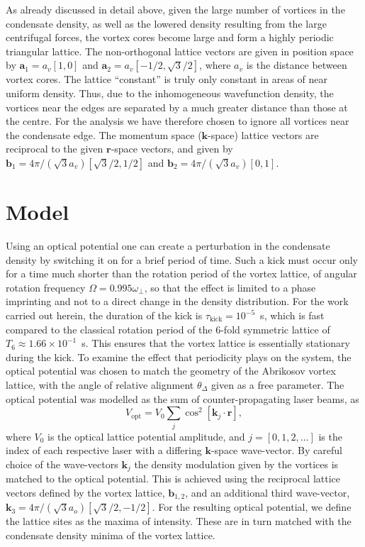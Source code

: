 As already discussed in detail above, given the large number of vortices in the condensate density, as well as the lowered density resulting from the large centrifugal forces, the vortex cores become large and form a highly periodic triangular lattice. The non-orthogonal lattice vectors are given in position space by $\mathbf{a}_1 = a_v[1,0]$ and $\mathbf{a}_2 = a_v[-1/2, \sqrt{3}/2]$, where $a_v$ is the distance between vortex cores. The lattice ``constant'' is truly only constant in areas of near uniform density. Thus, due to the inhomogeneous wavefunction density, the vortices near the edges are separated by a much greater distance than those at the centre. For the analysis we have therefore chosen to ignore all vortices near the condensate edge. The momentum space ($\mathbf{k}$-space) lattice vectors are reciprocal to the given $\mathbf{r}$-space vectors, and given by $\mathbf{b}_1 = 4\pi/(\sqrt{3}a_v)\left[\sqrt{3}/2,1/2\right]$ and $\mathbf{b}_2 = 4\pi/(\sqrt{3}a_v)\left[0,1\right]$.

\section{Model}

Using an optical potential one can create a perturbation in the condensate density by switching it on for a brief period of time. Such a kick must occur only for a time much shorter than the rotation period of the vortex lattice, of angular rotation frequency $\Omega = 0.995\omega_\perp$, so that the effect is limited to a phase imprinting and not to a direct change in the density distribution. For the work carried out herein, the duration of the kick is $\tau_{\text{kick}}=10^{-5}$~s, which is fast compared to the classical rotation period of the 6-fold symmetric lattice of $T_{6} \approx 1.66\times 10^{-1}$~s. This ensures that the vortex lattice is essentially stationary during the kick. To examine the effect that periodicity plays on the system, the optical potential was chosen to match the geometry of the Abrikosov vortex lattice, with the angle of relative alignment $\theta_\Delta$ given as a free parameter. The optical potential was modelled as the sum of counter-propagating laser beams, as
\begin{equation}
    V_{\text{opt}} = V_0\displaystyle\sum_{j}\cos^2 \left[ \textbf{k}_{j}\cdot\textbf{r} \right],
\end{equation}
where $V_0$ is the optical lattice potential amplitude, and $j=[0,1,2,\ldots ]$ is the index of each respective laser with a differing $\mathbf{k}$-space wave-vector. By careful choice of the wave-vectors $\textbf{k}_{j}$ the density modulation given by the vortices is matched to the optical potential. This is achieved using the reciprocal lattice vectors defined by the vortex lattice, $\mathbf{b}_{1,2}$, and an additional third wave-vector, $\mathbf{k}_3 = 4\pi/(\sqrt{3}a_o)\left[\sqrt{3}/2,-1/2\right]$. For the resulting optical potential, we define the lattice sites as the maxima of intensity. These are in turn matched with the condensate density minima of the vortex lattice.

